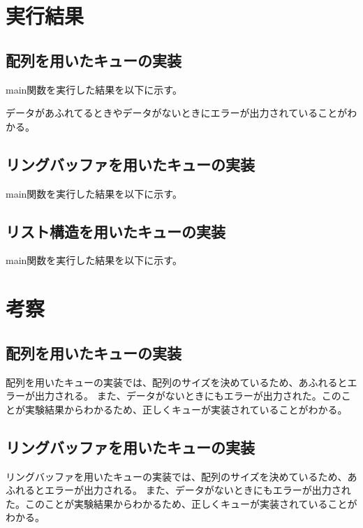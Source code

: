 \documentclass[dvipdfmx]{jsarticle}
\begin{document}
\section{実行結果}
\subsection{配列を用いたキューの実装}
main関数を実行した結果を以下に示す。

データがあふれてるときやデータがないときにエラーが出力されていることがわかる。
\subsection{リングバッファを用いたキューの実装}
main関数を実行した結果を以下に示す。


\subsection{リスト構造を用いたキューの実装}
main関数を実行した結果を以下に示す。


% 
\section{考察}
\subsection{配列を用いたキューの実装}
配列を用いたキューの実装では、配列のサイズを決めているため、あふれるとエラーが出力される。
また、データがないときにもエラーが出力された。このことが実験結果からわかるため、正しくキューが実装されていることがわかる。
\subsection{リングバッファを用いたキューの実装}
リングバッファを用いたキューの実装では、配列のサイズを決めているため、あふれるとエラーが出力される。
また、データがないときにもエラーが出力された。このことが実験結果からわかるため、正しくキューが実装されていることがわかる。
\end{document}
